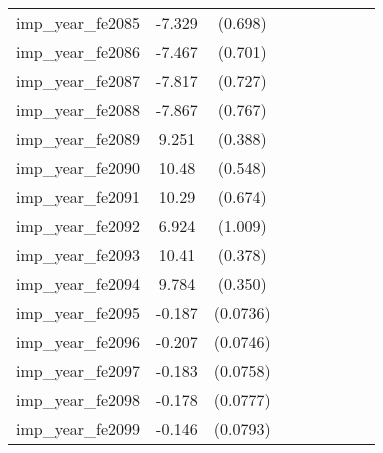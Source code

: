 {\begin{tabular}{l*{4}{cc}}
imp\_year\_fe2085&   -7.329\sym{***}&  (0.698)&                  &         &                  &         &                  &         \\
imp\_year\_fe2086&   -7.467\sym{***}&  (0.701)&                  &         &                  &         &                  &         \\
imp\_year\_fe2087&   -7.817\sym{***}&  (0.727)&                  &         &                  &         &                  &         \\
imp\_year\_fe2088&   -7.867\sym{***}&  (0.767)&                  &         &                  &         &                  &         \\
imp\_year\_fe2089&    9.251\sym{***}&  (0.388)&                  &         &                  &         &                  &         \\
imp\_year\_fe2090&    10.48\sym{***}&  (0.548)&                  &         &                  &         &                  &         \\
imp\_year\_fe2091&    10.29\sym{***}&  (0.674)&                  &         &                  &         &                  &         \\
imp\_year\_fe2092&    6.924\sym{***}&  (1.009)&                  &         &                  &         &                  &         \\
imp\_year\_fe2093&    10.41\sym{***}&  (0.378)&                  &         &                  &         &                  &         \\
imp\_year\_fe2094&    9.784\sym{***}&  (0.350)&                  &         &                  &         &                  &         \\
imp\_year\_fe2095&   -0.187\sym{*}  & (0.0736)&                  &         &                  &         &                  &         \\
imp\_year\_fe2096&   -0.207\sym{**} & (0.0746)&                  &         &                  &         &                  &         \\
imp\_year\_fe2097&   -0.183\sym{*}  & (0.0758)&                  &         &                  &         &                  &         \\
imp\_year\_fe2098&   -0.178\sym{*}  & (0.0777)&                  &         &                  &         &                  &         \\
imp\_year\_fe2099&   -0.146         & (0.0793)&                  &         &                  &         &                  &         \\

\end{tabular}}
